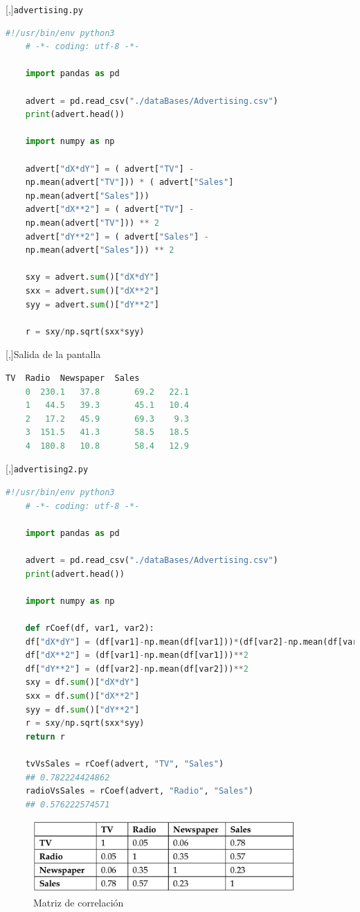 [,]{\texttt{advertising.py}}
\begin{lstlisting}[language=Python]
	#!/usr/bin/env python3
	# -*- coding: utf-8 -*-
	
	import pandas as pd
	
	advert = pd.read_csv("./dataBases/Advertising.csv")
	print(advert.head())
	
	import numpy as np
	
	advert["dX*dY"] = ( advert["TV"] -
	np.mean(advert["TV"])) * ( advert["Sales"]
	np.mean(advert["Sales"]))
	advert["dX**2"] = ( advert["TV"] -
	np.mean(advert["TV"])) ** 2
	advert["dY**2"] = ( advert["Sales"] -
	np.mean(advert["Sales"])) ** 2
	
	sxy = advert.sum()["dX*dY"]
	sxx = advert.sum()["dX**2"]
	syy = advert.sum()["dY**2"]
	
	r = sxy/np.sqrt(sxx*syy)
\end{lstlisting}


[,]{Salida de la pantalla}
\begin{lstlisting}[language=Python]
	TV  Radio  Newspaper  Sales
	0  230.1   37.8       69.2   22.1
	1   44.5   39.3       45.1   10.4
	2   17.2   45.9       69.3    9.3
	3  151.5   41.3       58.5   18.5
	4  180.8   10.8       58.4   12.9
\end{lstlisting}



[,]{\texttt{advertising2.py}}
\begin{lstlisting}[language=Python]
	#!/usr/bin/env python3
	# -*- coding: utf-8 -*-
	
	import pandas as pd
	
	advert = pd.read_csv("./dataBases/Advertising.csv")
	print(advert.head())
	
	import numpy as np
	
	def rCoef(df, var1, var2):
	df["dX*dY"] = (df[var1]-np.mean(df[var1]))*(df[var2]-np.mean(df[var2]))
	df["dX**2"] = (df[var1]-np.mean(df[var1]))**2
	df["dY**2"] = (df[var2]-np.mean(df[var2]))**2
	sxy = df.sum()["dX*dY"]
	sxx = df.sum()["dX**2"]
	syy = df.sum()["dY**2"]
	r = sxy/np.sqrt(sxx*syy)
	return r
	
	tvVsSales = rCoef(advert, "TV", "Sales")
	## 0.782224424862
	radioVsSales = rCoef(advert, "Radio", "Sales")
	## 0.576222574571
\end{lstlisting}




\begin{figure}
	\centering
	\includegraphics[width=10cm,keepaspectratio=true]{./images/correlationMatrix.png}
	\caption{Matriz de correlación}
	\label{correlationMatrix}
\end{figure}



